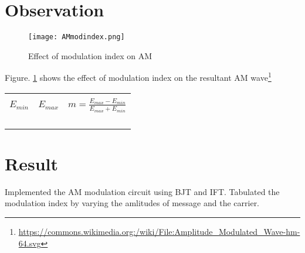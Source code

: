 \section*{Observation}


\begin{figure}[h]

\texttt{[image: AMmodindex.png]}
\caption{Effect of modulation index on AM}
\label{AMmodindex1}
\end{figure}
\noindent Figure. \ref{AMmodindex1}  shows the effect of modulation index on the resultant AM wave\footnote{\url{https://commons.wikimedia.org:/wiki/File:Amplitude_Modulated_Wave-hm-64.svg}}
\begin{center}

\begin{tabular}{|l|l|l|}

\hline
 & &\\
 
$E_{min}$  & $E_{max}$ & $m=\frac{E_{max}-E_{min}}{E_{max}+E_{min}}$ \\
 & & \\ \hline
 & & \\ \hline
& & \\ \hline
& & \\ \hline


\end{tabular}
\end{center}
\section*{Result}
Implemented the AM modulation circuit using BJT and IFT. Tabulated the modulation index by varying the amlitudes of message and the carrier.

